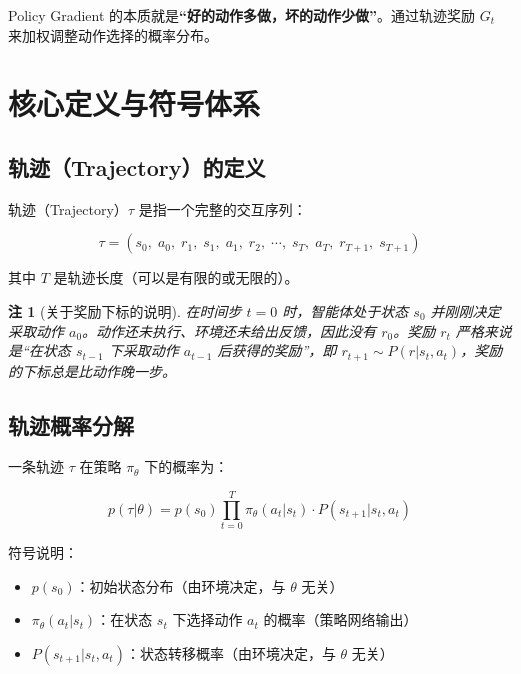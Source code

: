 \documentclass[12pt,a4paper]{article}
\theoremstyle{noteplain}
\newtheorem{notation}{注}[section]
\theoremstyle{noteexercise}
\begin{document}
\begin{keypoint}[核心结论]
  Policy Gradient 的本质就是\textbf{``好的动作多做，坏的动作少做''}。通过轨迹奖励 $G_t$ 来加权调整动作选择的概率分布。
\end{keypoint}

\section{核心定义与符号体系}\label{sec:def}

\subsection{轨迹（Trajectory）的定义}\label{ssec:trajectory}

轨迹（Trajectory）$\tau$ 是指一个完整的交互序列：

\begin{equation}\label{eq:tau}
  \tau = (s_0,\; a_0,\; r_1,\; s_1,\; a_1,\; r_2,\; \cdots,\; s_T,\; a_T,\; r_{T+1},\; s_{T+1})
\end{equation}

其中 $T$ 是轨迹长度（可以是有限的或无限的）。

\begin{notation}[关于奖励下标的说明]
  在时间步 $t=0$ 时，智能体处于状态 $s_0$ 并刚刚决定采取动作 $a_0$。动作还未执行、环境还未给出反馈，因此没有 $r_0$。奖励 $r_t$ 严格来说是``在状态 $s_{t-1}$ 下采取动作 $a_{t-1}$ 后获得的奖励''，即 $r_{t+1} \sim P(r|s_t,a_t)$，奖励的下标总是比动作晚一步。
\end{notation}

\subsection{轨迹概率分解}\label{ssec:prob-decompose}

一条轨迹 $\tau$ 在策略 $\pi_\theta$ 下的概率为：

\begin{equation}\label{eq:p-tau}
  p(\tau|\theta) = p(s_0) \prod_{t=0}^{T} \pi_\theta(a_t|s_t) \cdot P(s_{t+1}|s_t,a_t)
\end{equation}

符号说明：
\begin{itemize}
  \setlength{\itemsep}{0.2em}
  \item $p(s_0)$：初始状态分布（由环境决定，与 $\theta$ 无关）
  \item $\pi_\theta(a_t|s_t)$：在状态 $s_t$ 下选择动作 $a_t$ 的概率（策略网络输出）
  \item $P(s_{t+1}|s_t,a_t)$：状态转移概率（由环境决定，与 $\theta$ 无关）
\end{itemize}
\end{document}
